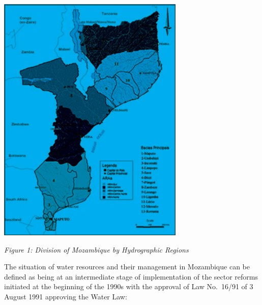 \documentclass[
]{book}
\begin{document}
\includegraphics{Figure32.png}

\emph{Figure 1: Division of Mozambique by Hydrographic Regions}

The situation of water resources and their management in Mozambique can be defined as being at an intermediate stage of implementation of the sector reforms initiated at the beginning of the 1990s with the approval of Law No.~16/91 of 3 August 1991 approving the Water Law:
\end{document}
